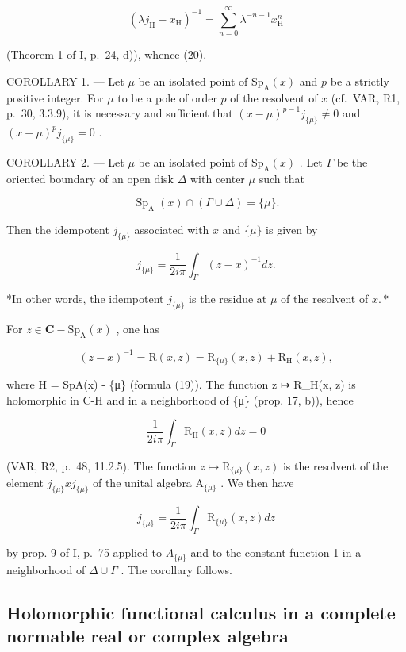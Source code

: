 \[
\left(\lambda j _ {\mathrm{H}} - x _ {\mathrm{H}}\right) ^ {- 1} = \sum_ {n = 0} ^ {\infty} \lambda^ {- n - 1} x _ {\mathrm{H}} ^ {n}
\]

(Theorem 1 of I, p.~24, d)), whence (20).

COROLLARY 1. --- Let \(\mu\) be an isolated point of \(\mathrm{Sp}_{\mathrm{A}}(x)\) and \(p\) be a strictly positive integer. For \(\mu\) to be a pole of order \(p\) of the resolvent of \(x\) (cf.~VAR, R1, p.~30, 3.3.9), it is necessary and sufficient that \((x - \mu)^{p-1} j_{\{\mu\}} \neq 0\) and \((x - \mu)^{p} j_{\{\mu\}} = 0\) .

COROLLARY 2. --- Let \(\mu\) be an isolated point of \(\mathrm{Sp}_{\mathrm{A}}(x)\) . Let \(\Gamma\) be the oriented boundary of an open disk \(\Delta\) with center \(\mu\) such that

\[
\operatorname{Sp} _ {\mathrm{A}} (x) \cap (\Gamma \cup \Delta) = \{\mu \}.
\]

Then the idempotent \(j_{\{\mu \}}\) associated with \(x\) and \(\{\mu\}\) is given by

\[
j _ {\{\mu \}} = \frac {1}{2 i \pi} \int_ {\Gamma} (z - x) ^ {- 1} d z.
\]

*In other words, the idempotent \(j_{\{\mu\}}\) is the residue at \(\mu\) of the resolvent of \(x.*\)

For \(z\in \mathbf{C} - \mathrm{Sp}_{\mathrm{A}}(x)\) , one has

\[
(z - x) ^ {- 1} = \mathrm{R} (x, z) = \mathrm{R} _ {\{\mu \}} (x, z) + \mathrm{R} _ {\mathrm{H}} (x, z),
\]

where H = SpA(x) - \{μ\} (formula (19)). The function z ↦ R\_H(x, z) is holomorphic in C-H and in a neighborhood of \{μ\} (prop. 17, b)), hence

\[
\frac {1}{2 i \pi} \int_ {\Gamma} \mathrm{R} _ {\mathrm{H}} (x, z) d z = 0
\]

(VAR, R2, p.~48, 11.2.5). The function \(z \mapsto \mathrm{R}_{\{\mu\}}(x,z)\) is the resolvent of the element \(j_{\{\mu\}}xj_{\{\mu\}}\) of the unital algebra \(\mathrm{A}_{\{\mu\}}\) . We then have

\[
j _ {\{\mu \}} = \frac {1}{2 i \pi} \int_ {\Gamma} \mathrm{R} _ {\{\mu \}} (x, z) d z
\]

by prop. 9 of I, p.~75 applied to \(A_{\{\mu\}}\) and to the constant function 1 in a neighborhood of \(\Delta \cup \Gamma\) . The corollary follows.

\subsection{Holomorphic functional calculus in a complete normable real or complex algebra}

